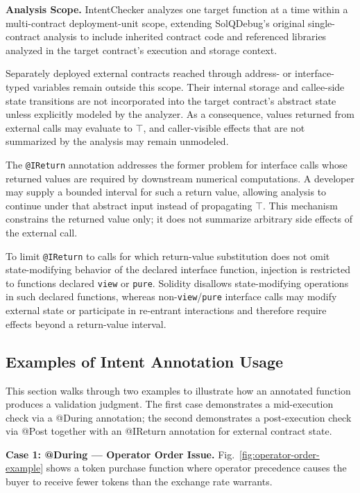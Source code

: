 \documentclass[pdflatex,sn-basic]{sn-jnl}%
\theoremstyle{thmstyleone}%
\theoremstyle{thmstyletwo}%
\theoremstyle{thmstylethree}%
\begin{document}
\smallskip
\noindent\textbf{Analysis Scope.}
IntentChecker analyzes one target function at a time within a multi-contract
deployment-unit scope, extending SolQDebug's original single-contract analysis
to include inherited contract code and referenced libraries analyzed in the
target contract's execution and storage context.

Separately deployed external contracts reached through address- or
interface-typed variables remain outside this scope. Their internal storage and
callee-side state transitions are not incorporated into the target contract's
abstract state unless explicitly modeled by the analyzer. As a consequence,
values returned from external calls may evaluate to $\top$, and caller-visible
effects that are not summarized by the analysis may remain unmodeled.

The \texttt{@IReturn} annotation addresses the former problem for interface
calls whose returned values are required by downstream numerical computations.
A developer may supply a bounded interval for such a return value, allowing
analysis to continue under that abstract input instead of propagating $\top$.
This mechanism constrains the returned value only; it does not summarize
arbitrary side effects of the external call.

To limit \texttt{@IReturn} to calls for which return-value substitution does
not omit state-modifying behavior of the declared interface function, injection
is restricted to functions declared \texttt{view} or \texttt{pure}. Solidity
disallows state-modifying operations in such declared functions, whereas
non-\texttt{view}/\texttt{pure} interface calls may modify external state or
participate in re-entrant interactions and therefore require effects beyond a
return-value interval.
\subsection{Examples of Intent Annotation Usage}

This section walks through two examples to illustrate how an annotated function produces a validation judgment.
The first case demonstrates a mid-execution check via a @During annotation; the second demonstrates a post-execution check via @Post together with an @IReturn annotation for external contract state.

\smallskip
\noindent\textbf{Case 1: @During --- Operator Order Issue.}
Fig.~\ref{fig:operator-order-example} shows a token purchase function where operator precedence causes the buyer to receive fewer tokens than the exchange rate warrants.
\end{document}
